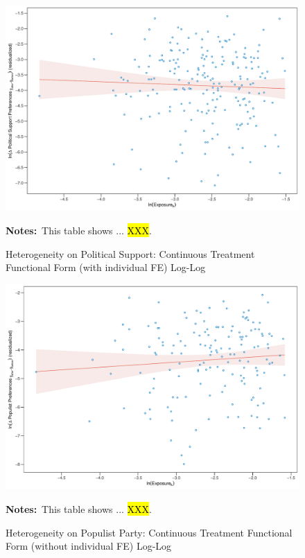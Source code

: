 \documentclass[11pt]{article}
\begin{document}
\begin{figure}[htbp!]
    \centering
    \caption{Heterogeneity on Political Support: Continuous Treatment Functional Form (with individual FE) Log-Log}\label{fig:ps_functional_form_cbk_past_mean_ife_logs}
    \includegraphics[width=1\linewidth]{heterogeneity/ps_functional_form_cbk_past_mean_ife_logs}
    \begin{tablenotes}
        \footnotesize
        \item \textbf{Notes:}~This table shows ... \hl{XXX}.
    \end{tablenotes} 
\end{figure}

\begin{figure}[htbp!]
    \centering
    \caption{Heterogeneity on Populist Party: Continuous Treatment Functional Form (without individual FE) Log-Log}\label{fig:pp_functional_form_cbk_past_mean_noife_logs}
    \includegraphics[width=1\linewidth]{heterogeneity/pp_functional_form_cbk_past_mean_noife_logs}
    \begin{tablenotes}
        \footnotesize
        \item \textbf{Notes:}~This table shows ... \hl{XXX}.
    \end{tablenotes} 
\end{figure}
\end{document}
